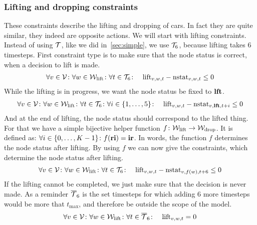 \subsubsection{Lifting and dropping constraints}
These constraints describe the lifting and dropping of cars. In fact they are
quite similar, they indeed are opposite actions. We will start with lifting
constraints. Instead of using $\mathcal{T}$, like we did in~\autoref{sec:simple}, we use
$\mathcal{T}_6$, because lifting takes 6 timesteps. First constraint type is to make sure
that the node status is correct, when a decision to lift is made.
\begin{align}
    &\forall v \in \mathcal{V} \colon \forall w \in \mathcal{W}_\mathrm{lift} \colon \forall t \in \mathcal{T}_6 \colon
    &\mathrm{lift}_{v,w,t} - \mathrm{nstat}_{v,w,t} \leq 0
\end{align}
While the lifting is in progress, we want the node status be fixed to
$\text{\bf lft}$.
\begin{align}
    &\forall v \in \mathcal{V} \colon \forall w \in \mathcal{W}_\mathrm{lift} \colon \forall t \in \mathcal{T}_6 \colon
    \forall i \in \{1,\ldots,5\} \colon &\mathrm{lift}_{v,w,t} -
    \mathrm{nstat}_{v,\text{\bf lft},t+i} \leq 0
\end{align}
And at the end of lifting, the node status should correspond to the lifted
thing. For that we have a simple bijective helper function $f \colon \mathcal{W}_\mathrm{lift} \to \mathcal{W}_\mathrm{drop}$. It is
defined as: $\forall i \in \{0,\ldots,K-1\} \colon f(\text{\bf ri}) = \text{\bf ir}$.
In words, the function $f$ determines the node status after lifting. By using
$f$ we can now give the constraints, which determine the node status after
lifting.
\begin{align}
    &\forall v \in \mathcal{V} \colon \forall w \in \mathcal{W}_\mathrm{lift} \colon \forall t \in \mathcal{T}_6 \colon
    &\mathrm{lift}_{v,w,t} - \mathrm{nstat}_{v,f(w),t+6} \leq 0
\end{align}
If the lifting cannot be completed, we just make sure that the decision is
never made. As a reminder $\overline{\mathcal{T}}_6$ is the set timesteps for which adding 6 more
timesteps would be more that $t_{\max}$, and therefore be outside the scope of
the model.
\begin{align}
    &\forall v \in \mathcal{V} \colon \forall w \in \mathcal{W}_\mathrm{lift} \colon \forall t \in \overline{\mathcal{T}}_6
    \colon &\mathrm{lift}_{v,w,t} = 0
\end{align}

